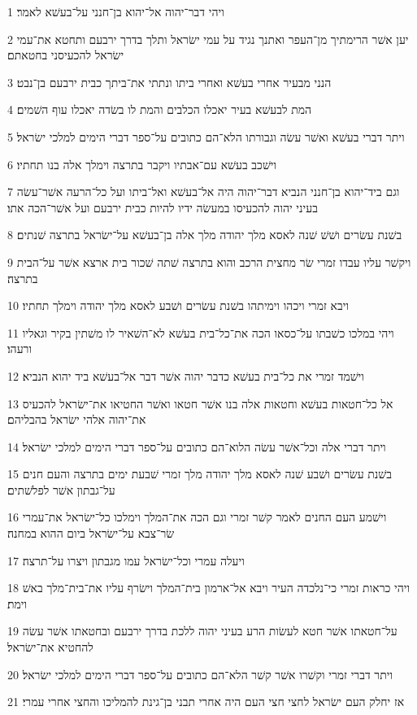 \par 1 ויהי דבר־יהוה אל־יהוא בן־חנני על־בעשׁא לאמר׃
\par 2 יען אשׁר הרימתיך מן־העפר ואתנך נגיד על עמי ישׂראל ותלך בדרך ירבעם ותחטא את־עמי ישׂראל להכעיסני בחטאתם׃
\par 3 הנני מבעיר אחרי בעשׁא ואחרי ביתו ונתתי את־ביתך כבית ירבעם בן־נבט׃
\par 4 המת לבעשׁא בעיר יאכלו הכלבים והמת לו בשׂדה יאכלו עוף השׁמים׃
\par 5 ויתר דברי בעשׁא ואשׁר עשׂה וגבורתו הלא־הם כתובים על־ספר דברי הימים למלכי ישׂראל׃
\par 6 וישׁכב בעשׁא עם־אבתיו ויקבר בתרצה וימלך אלה בנו תחתיו׃
\par 7 וגם ביד־יהוא בן־חנני הנביא דבר־יהוה היה אל־בעשׁא ואל־ביתו ועל כל־הרעה אשׁר־עשׂה בעיני יהוה להכעיסו במעשׂה ידיו להיות כבית ירבעם ועל אשׁר־הכה אתו׃
\par 8 בשׁנת עשׂרים ושׁשׁ שׁנה לאסא מלך יהודה מלך אלה בן־בעשׁא על־ישׂראל בתרצה שׁנתים׃
\par 9 ויקשׁר עליו עבדו זמרי שׂר מחצית הרכב והוא בתרצה שׁתה שׁכור בית ארצא אשׁר על־הבית בתרצה׃
\par 10 ויבא זמרי ויכהו וימיתהו בשׁנת עשׂרים ושׁבע לאסא מלך יהודה וימלך תחתיו׃
\par 11 ויהי במלכו כשׁבתו על־כסאו הכה את־כל־בית בעשׁא לא־השׁאיר לו משׁתין בקיר וגאליו ורעהו׃
\par 12 וישׁמד זמרי את כל־בית בעשׁא כדבר יהוה אשׁר דבר אל־בעשׁא ביד יהוא הנביא׃
\par 13 אל כל־חטאות בעשׁא וחטאות אלה בנו אשׁר חטאו ואשׁר החטיאו את־ישׂראל להכעיס את־יהוה אלהי ישׂראל בהבליהם׃
\par 14 ויתר דברי אלה וכל־אשׁר עשׂה הלוא־הם כתובים על־ספר דברי הימים למלכי ישׂראל׃
\par 15 בשׁנת עשׂרים ושׁבע שׁנה לאסא מלך יהודה מלך זמרי שׁבעת ימים בתרצה והעם חנים על־גבתון אשׁר לפלשׁתים׃
\par 16 וישׁמע העם החנים לאמר קשׁר זמרי וגם הכה את־המלך וימלכו כל־ישׂראל את־עמרי שׂר־צבא על־ישׂראל ביום ההוא במחנה׃
\par 17 ויעלה עמרי וכל־ישׂראל עמו מגבתון ויצרו על־תרצה׃
\par 18 ויהי כראות זמרי כי־נלכדה העיר ויבא אל־ארמון בית־המלך וישׂרף עליו את־בית־מלך באשׁ וימת׃
\par 19 על־חטאתו אשׁר חטא לעשׂות הרע בעיני יהוה ללכת בדרך ירבעם ובחטאתו אשׁר עשׂה להחטיא את־ישׂראל׃
\par 20 ויתר דברי זמרי וקשׁרו אשׁר קשׁר הלא־הם כתובים על־ספר דברי הימים למלכי ישׂראל׃
\par 21 אז יחלק העם ישׂראל לחצי חצי העם היה אחרי תבני בן־גינת להמליכו והחצי אחרי עמרי׃
